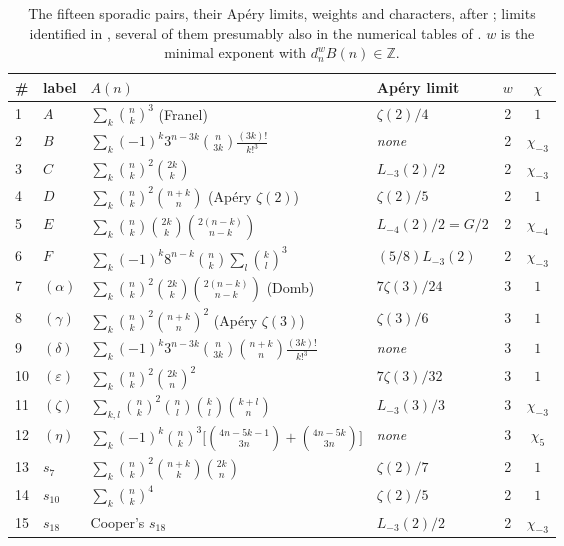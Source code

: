\documentclass[11pt,reqno]{article}
\newcommand{\ZZ}{\mathbb{Z}}
\newcommand{\bin}[2]{\binom{#1}{#2}}
\theoremstyle{plain}
\theoremstyle{definition}
\theoremstyle{remark}
\numberwithin{equation}{section}
\begin{document}
\begin{table}[t]
\centering\small
\caption{The fifteen sporadic pairs, their Ap\'ery limits, weights and
characters, after \cite{MalikStraub,Straub2023}; limits identified in
\cite{PaperA-inprep}, several of them presumably also in the numerical tables of
\cite{ASvSZ2008}.  $w$ is the minimal exponent with $d_n^wB(n)\in\ZZ$.}
\label{tab:families}
\begin{tabular}{@{}llllcc@{}}
\toprule
\# & label & $A(n)$ & Ap\'ery limit & $w$ & $\chi$\\
\midrule
1 & $A$ & $\sum_k\bin{n}{k}^3$ (Franel) & $\zeta(2)/4$ & 2 & $1$\\
2 & $B$ & $\sum_k(-1)^k3^{n-3k}\bin{n}{3k}\frac{(3k)!}{k!^3}$ & \emph{none} & 2 & $\chi_{-3}$\\
3 & $C$ & $\sum_k\bin{n}{k}^2\bin{2k}{k}$ & $L_{-3}(2)/2$ & 2 & $\chi_{-3}$\\
4 & $D$ & $\sum_k\bin{n}{k}^2\bin{n+k}{n}$ (Ap\'ery $\zeta(2)$) & $\zeta(2)/5$ & 2 & $1$\\
5 & $E$ & $\sum_k\bin{n}{k}\bin{2k}{k}\bin{2(n-k)}{n-k}$ & $L_{-4}(2)/2=G/2$ & 2 & $\chi_{-4}$\\
6 & $F$ & $\sum_k(-1)^k8^{n-k}\bin{n}{k}\sum_l\bin{k}{l}^3$ & $(5/8)L_{-3}(2)$ & 2 & $\chi_{-3}$\\
7 & $(\alpha)$ & $\sum_k\bin{n}{k}^2\bin{2k}{k}\bin{2(n-k)}{n-k}$ (Domb) & $7\zeta(3)/24$ & 3 & $1$\\
8 & $(\gamma)$ & $\sum_k\bin{n}{k}^2\bin{n+k}{n}^2$ (Ap\'ery $\zeta(3)$) & $\zeta(3)/6$ & 3 & $1$\\
9 & $(\delta)$ & $\sum_k(-1)^k3^{n-3k}\bin{n}{3k}\bin{n+k}{n}\frac{(3k)!}{k!^3}$ & \emph{none} & 3 & $1$\\
10 & $(\varepsilon)$ & $\sum_k\bin{n}{k}^2\bin{2k}{n}^2$ & $7\zeta(3)/32$ & 3 & $1$\\
11 & $(\zeta)$ & $\sum_{k,l}\bin{n}{k}^2\bin{n}{l}\bin{k}{l}\bin{k+l}{n}$ & $L_{-3}(3)/3$ & 3 & $\chi_{-3}$\\
12 & $(\eta)$ & $\sum_k(-1)^k\bin{n}{k}^3\bigl[\bin{4n-5k-1}{3n}+\bin{4n-5k}{3n}\bigr]$ & \emph{none} & 3 & $\chi_{5}$\\
13 & $s_7$ & $\sum_k\bin{n}{k}^2\bin{n+k}{k}\bin{2k}{n}$ & $\zeta(2)/7$ & 2 & $1$\\
14 & $s_{10}$ & $\sum_k\bin{n}{k}^4$ & $\zeta(2)/5$ & 2 & $1$\\
15 & $s_{18}$ & Cooper's $s_{18}$ & $L_{-3}(2)/2$ & 2 & $\chi_{-3}$\\
\bottomrule
\end{tabular}
\end{table}
\end{document}
